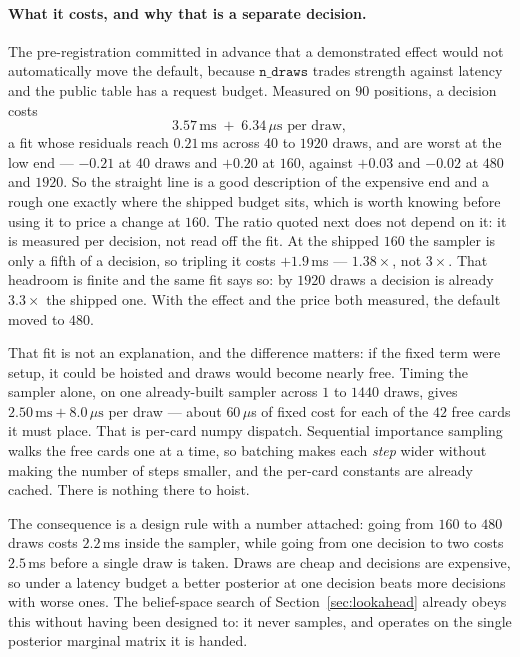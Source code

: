 \documentclass[11pt,letterpaper]{article}
\begin{document}
\paragraph{What it costs, and why that is a separate decision.} The
pre-registration committed in advance that a demonstrated effect would not
automatically move the default, because $\texttt{n\_draws}$ trades strength
against latency and the public table has a request budget. Measured on $90$
positions, a decision costs
\[
  3.57\,\mathrm{ms} \;+\; 6.34\,\mu\mathrm{s} \text{ per draw},
\]
a fit whose residuals reach $0.21$\,ms across $40$ to $1920$ draws, and are
worst at the low end --- $-0.21$ at $40$ draws and $+0.20$ at $160$, against
$+0.03$ and $-0.02$ at $480$ and $1920$. So the straight line is a good
description of the expensive end and a rough one exactly where the shipped
budget sits, which is worth knowing before using it to price a change at $160$.
The ratio quoted next does not depend on it: it is measured per decision, not
read off the fit. At the
shipped $160$ the sampler is only a fifth of a decision, so tripling it costs
$+1.9$\,ms --- $1.38\times$, not $3\times$. That headroom is finite and the same
fit says so: by $1920$ draws a decision is already $3.3\times$ the shipped one.
With the effect and the price both measured, the default moved to $480$.

That fit is not an explanation, and the difference matters: if the fixed term
were setup, it could be hoisted and draws would become nearly free. Timing the
sampler alone, on one already-built sampler across $1$ to $1440$ draws, gives
$2.50\,\mathrm{ms} + 8.0\,\mu\mathrm{s}$ per draw --- about $60\,\mu$s of fixed
cost for each of the $42$ free cards it must place. That is per-card numpy
dispatch. Sequential importance sampling walks the free cards one at a time, so
batching makes each \emph{step} wider without making the number of steps
smaller, and the per-card constants are already cached. There is nothing there to
hoist.

The consequence is a design rule with a number attached: going from $160$ to
$480$ draws costs $2.2$\,ms inside the sampler, while going from one decision to
two costs $2.5$\,ms before a single draw is taken. Draws are cheap and decisions
are expensive, so under a latency budget a better posterior at one decision beats
more decisions with worse ones. The belief-space search of
Section~\ref{sec:lookahead} already obeys this without having been designed to: it
never samples, and operates on the single posterior marginal matrix it is handed.
\end{document}
